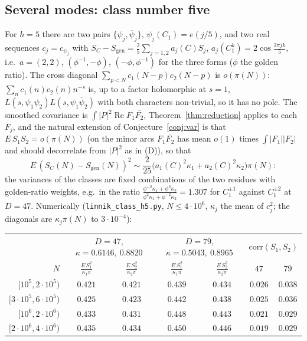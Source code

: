 \documentclass[11pt]{amsart}
\theoremstyle{remark}
\begin{document}
\subsection{Several modes: class number five}\label{subsec:h5}
For $h=5$ there are two pairs $\{\psi_j,\overline\psi_j\}$, $\psi_j(C_1)=e(j/5)$, and two real sequences $c_j=c_{\psi_j}$ with $S_C-S_\mathrm{gen}=\frac25\sum_{j=1,2}a_j(C)S_j$, $a_j(C_1^k)=2\cos\frac{2\pi jk}5$, i.e.\ $a=(2,2)$, $(\phi^{-1},-\phi)$, $(-\phi,\phi^{-1})$ for the three forms ($\phi$ the golden ratio). The cross diagonal $\sum_{p<N}c_1(N-p)c_2(N-p)$ is $o(\pi(N))$: $\sum_nc_1(n)c_2(n)n^{-s}$ is, up to a factor holomorphic at $s=1$, $L(s,\psi_1\psi_2)L(s,\psi_1\overline\psi_2)$ with both characters non-trivial, so it has no pole. The smoothed covariance is $\int|P|^2\operatorname{Re}F_1\overline{F_2}$, Theorem~\ref{thm:reduction} applies to each $F_j$, and the natural extension of Conjecture~\ref{conj:var} is that $E\,S_1S_2=o(\pi(N))$ (on the minor arcs $F_1\overline{F_2}$ has mean $o(1)$ times $\int|F_1||F_2|$ and should decorrelate from $|P|^2$ as in (D)), so that
\[
E\,(S_C(N)-S_\mathrm{gen}(N))^2\sim\frac2{25}\bigl(a_1(C)^2\kappa_1+a_2(C)^2\kappa_2\bigr)\pi(N):
\]
the variances of the classes are fixed combinations of the two residues with golden-ratio weights, e.g.\ in the ratio $\frac{\phi^{-2}\kappa_1+\phi^2\kappa_2}{\phi^2\kappa_1+\phi^{-2}\kappa_2}=1.307$ for $C_1^{\pm1}$ against $C_1^{\pm2}$ at $D=47$. Numerically (\texttt{linnik\_class\_h5.py}, $N\le4\cdot10^6$, $\kappa_j$ the mean of $c_j^2$; the diagonals are $\kappa_j\pi(N)$ to $3\cdot10^{-4}$):
\begin{center}\footnotesize
\begin{tabular}{r|cc|cc|cc}
\toprule
& \multicolumn{2}{c|}{$D=47$, $\kappa=0.6146,\ 0.8820$} & \multicolumn{2}{c|}{$D=79$, $\kappa=0.5043,\ 0.8965$} & \multicolumn{2}{c}{$\mathrm{corr}(S_1,S_2)$}\\
$N$ & $\frac{E\,S_1^2}{\kappa_1\pi}$ & $\frac{E\,S_2^2}{\kappa_2\pi}$ & $\frac{E\,S_1^2}{\kappa_1\pi}$ & $\frac{E\,S_2^2}{\kappa_2\pi}$ & $47$ & $79$\\
\midrule
$[10^5,2\cdot10^5)$ & $0.421$ & $0.421$ & $0.439$ & $0.434$ & $0.026$ & $0.038$\\
$[3\cdot10^5,6\cdot10^5)$ & $0.425$ & $0.423$ & $0.442$ & $0.438$ & $0.025$ & $0.036$\\
$[10^6,2\cdot10^6)$ & $0.433$ & $0.431$ & $0.448$ & $0.443$ & $0.021$ & $0.029$\\
$[2\cdot10^6,4\cdot10^6)$ & $0.435$ & $0.434$ & $0.450$ & $0.446$ & $0.019$ & $0.029$\\
\bottomrule
\end{tabular}
\end{center}
\end{document}
